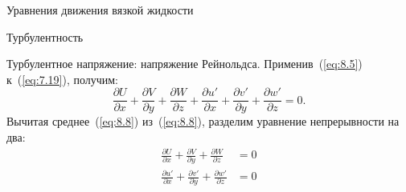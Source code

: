 \begin{chapter}{Уравнения движения вязкой жидкости}
\begin{section}{Турбулентность}
\begin{paragraph}{Турбулентное напряжение: напряжение Рейнольдса.}
Применив~(\ref{eq:8.5}) к~(\ref{eq:7.19}), получим:
\begin{equation}\label{eq:8.8}
  \frac{\partial{U }}{\partial{x}} + \frac{\partial{V }}{\partial{y}}
 +\frac{\partial{W }}{\partial{z}} + \frac{\partial{u'}}{\partial{x}} 
 +\frac{\partial{v'}}{\partial{y}} + \frac{\partial{w'}}{\partial{z}} = 0.
\end{equation}
Вычитая среднее~(\ref{eq:8.8}) из~(\ref{eq:8.8}), разделим уравнение 
непрерывности на два:
\begin{subequations}
\begin{align}
\frac{\partial{U }}{\partial{x}} 
 + \frac{\partial{V }}{\partial{y}} 
 + \frac{\partial{W }}{\partial{z}} &=0 \\
\frac{\partial{u'}}{\partial{x}} 
 + \frac{\partial{v'}}{\partial{y}} 
 + \frac{\partial{w'}}{\partial{z}} &=0
\end{align}
\end{subequations}
%


\end{paragraph}
\end{section}
\end{chapter}
